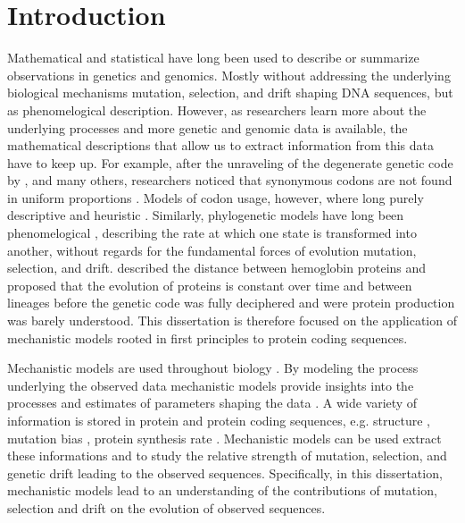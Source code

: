 \chapter{Introduction} 
\label{ch:introduction}

Mathematical and statistical have long been used to describe or summarize observations in genetics and genomics.
Mostly without addressing the underlying biological mechanisms mutation, selection, and drift shaping DNA sequences, but as phenomelogical description.
However, as researchers learn more about the underlying processes and more genetic and genomic data is available, the mathematical descriptions that allow us to extract information from this data have to keep up.
For example, after the unraveling of the degenerate genetic code by \citet{MatthaeiAndNirenberg1961,NirenbergAndMatthaei1961,Maxwell1962,LederAndNirenberg1964}, and many others, researchers noticed that synonymous codons are not found in uniform proportions \citep{fitch1976,grantham1980,ikemura1981,grantham1981,sharp1988}.
Models of codon usage, however, where long purely descriptive and heuristic \citep{ikemura1981,BennetzenAndHall1982,sharp1987,wright1990}.
Similarly, phylogenetic models have long been phenomelogical \citep{JukesAndCantor1969,Dayhoff1978,Kimura1980,felsenstein1981,Altschul1991}, describing the rate at which one state is transformed into another, without regards for the fundamental forces of evolution mutation, selection, and drift.
\citet{ZuckerkandlAndPauling1962} described the distance between hemoglobin proteins and proposed that the evolution of proteins is constant over time and between lineages before the genetic code was fully deciphered and were protein production was barely understood.
This dissertation is therefore focused on the application of mechanistic models rooted in first principles to protein coding sequences.

Mechanistic models are used throughout biology \citep{GoldmanAndYang1994,loreau1998,DavisAndPelsor2001,adf2007,McGill2007}.
By modeling the process underlying the observed data mechanistic models provide insights into the processes and estimates of parameters shaping the data \citep{Liberles2013}.
A wide variety of information is stored in protein and protein coding sequences, e.g. structure \citep{anfinsen1973}, mutation bias \citep{ShahAndGilchrist2011, gilchrist2015}, protein synthesis rate \citep{gilchrist2007,gilchrist2015}. 
Mechanistic models can be used extract these informations and to study the relative strength of mutation, selection, and genetic drift leading to the observed sequences.
Specifically, in this dissertation, mechanistic models lead to an understanding of the contributions of mutation, selection and drift on the evolution of observed sequences.

